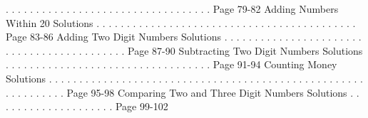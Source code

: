 \documentclass{article}%
\begin{document}
.%
.%
.%
.%
.%
.%
.%
.%
.%
.%
.%
.%
.%
.%
.%
.%
.%
.%
.%
.%
.%
.%
.%
.%
.%
.%
.%
.%
.%
.%
.%
.%
.%
.%
Page 79{-}82%
\newline%
Adding Numbers Within 20 Solutions%
.%
.%
.%
.%
.%
.%
.%
.%
.%
.%
.%
.%
.%
.%
.%
.%
.%
.%
.%
.%
.%
.%
.%
.%
.%
.%
.%
.%
.%
.%
.%
.%
.%
.%
.%
.%
.%
.%
.%
.%
.%
.%
.%
Page 83{-}86%
\newline%
Adding Two Digit Numbers Solutions%
.%
.%
.%
.%
.%
.%
.%
.%
.%
.%
.%
.%
.%
.%
.%
.%
.%
.%
.%
.%
.%
.%
.%
.%
.%
.%
.%
.%
.%
.%
.%
.%
.%
.%
.%
.%
.%
.%
.%
.%
.%
.%
.%
Page 87{-}90%
\newline%
Subtracting Two Digit Numbers Solutions%
.%
.%
.%
.%
.%
.%
.%
.%
.%
.%
.%
.%
.%
.%
.%
.%
.%
.%
.%
.%
.%
.%
.%
.%
.%
.%
.%
.%
.%
.%
.%
.%
.%
.%
Page 91{-}94%
\newline%
Counting Money Solutions%
.%
.%
.%
.%
.%
.%
.%
.%
.%
.%
.%
.%
.%
.%
.%
.%
.%
.%
.%
.%
.%
.%
.%
.%
.%
.%
.%
.%
.%
.%
.%
.%
.%
.%
.%
.%
.%
.%
.%
.%
.%
.%
.%
.%
.%
.%
.%
.%
.%
.%
.%
.%
.%
.%
.%
.%
.%
.%
.%
.%
.%
.%
Page 95{-}98%
\newline%
Comparing Two and Three Digit Numbers Solutions%
.%
.%
.%
.%
.%
.%
.%
.%
.%
.%
.%
.%
.%
.%
.%
.%
.%
.%
.%
.%
Page 99{-}102%
\newline%
\newpage
\end{document}
